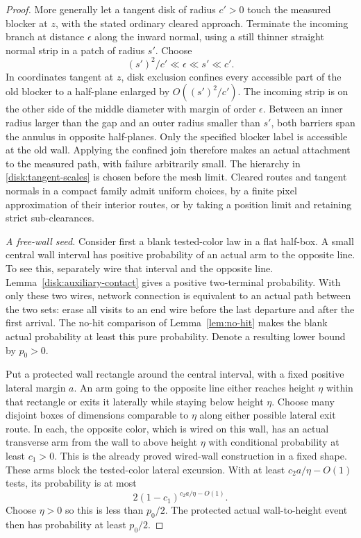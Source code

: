 \begin{proof}
More generally let a tangent disk of radius $c'>0$ touch the measured
blocker at $z$, with the stated ordinary cleared approach. Terminate
the incoming branch at distance $\epsilon$ along the inward normal,
using a still thinner straight normal strip in a patch of radius $s'$.
Choose
\begin{equation}\label{disk:tangent-scales}
       (s')^2/c'\ll\epsilon\ll s'\ll c'.
\end{equation}
In coordinates tangent at $z$, disk exclusion confines every accessible
part of the old blocker to a half-plane enlarged by
$O((s')^2/c')$. The incoming strip is on the other side of the middle
diameter with margin of order $\epsilon$. Between an inner radius
larger than the gap and an outer radius smaller than $s'$, both
barriers span the annulus in opposite half-planes. Only the specified
blocker label is accessible at the old wall. Applying the confined
join therefore makes an actual attachment to the measured path, with
failure arbitrarily small. The hierarchy in
\eqref{disk:tangent-scales} is chosen before the mesh limit. Cleared
routes and tangent normals in a compact family admit uniform choices,
by a finite pixel approximation of their interior routes, or by taking
a position limit and retaining strict sub-clearances.

\emph{A free-wall seed.}
Consider first a blank tested-color law in a flat half-box. A small
central wall interval has positive probability of an actual arm to
the opposite line. To see this, separately wire that interval and
the opposite line. Lemma~\ref{disk:auxiliary-contact} gives a positive
two-terminal probability. With only these two wires, network
connection is equivalent to an actual path between the two sets:
erase all visits to an end wire before the last departure and after
the first arrival. The no-hit comparison of Lemma~\ref{lem:no-hit}
makes the blank actual probability at least this pure probability.
Denote a resulting lower bound by $p_0>0$.

Put a protected wall rectangle around the central interval, with a
fixed positive lateral margin $a$. An arm going to the opposite line
either reaches height $\eta$ within that rectangle or exits it
laterally while staying below height $\eta$. Choose many disjoint
boxes of dimensions comparable to $\eta$ along either possible
lateral exit route. In each, the opposite color, which is wired on
this wall, has an actual transverse arm from the wall to above height
$\eta$ with conditional probability at least $c_1>0$. This is the
already proved wired-wall construction in a fixed shape. These arms
block the tested-color lateral excursion. With at least
$c_2a/\eta-O(1)$ tests, its probability is at most
\[
  2(1-c_1)^{c_2a/\eta-O(1)}.
\]
Choose $\eta>0$ so this is less than $p_0/2$. The protected actual
wall-to-height event then has probability at least $p_0/2$.


\end{proof}
